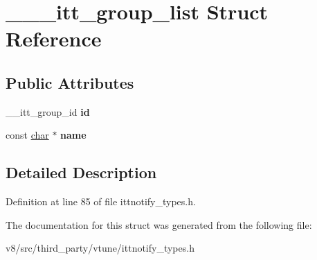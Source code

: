 \hypertarget{struct______itt__group__list}{}\section{\+\_\+\+\_\+\+\_\+itt\+\_\+group\+\_\+list Struct Reference}
\label{struct______itt__group__list}
\subsection*{Public Attributes}
\begin{DoxyCompactItemize}
\item 
\mbox{\label{struct______itt__group__list_a0be1db69af1d8a515915bf594f0f9a7e}} 
\+\_\+\+\_\+itt\+\_\+group\+\_\+id {\bfseries id}
\item 
\mbox{\label{struct______itt__group__list_a7ec0e147be42b6d715189f283d6d6784}} 
const \mbox{\hyperlink{classchar}{char}} $\ast$ {\bfseries name}
\end{DoxyCompactItemize}


\subsection{Detailed Description}


Definition at line 85 of file ittnotify\+\_\+types.\+h.



The documentation for this struct was generated from the following file\+:\begin{DoxyCompactItemize}
\item 
v8/src/third\+\_\+party/vtune/ittnotify\+\_\+types.\+h\end{DoxyCompactItemize}
